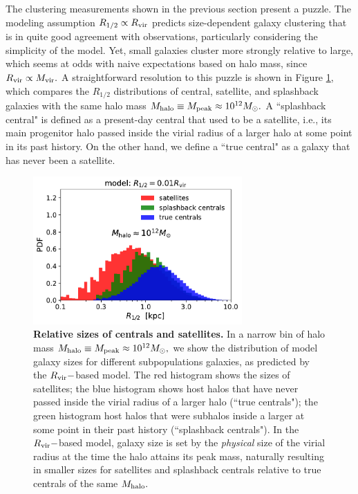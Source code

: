 \documentclass[usenatbib,usegraphicx,letterpaper]{mn2e}
\newcommand{\rhalf}{R_{1/2}}
\newcommand{\mvir}{M_{\rm vir}}
\newcommand{\mpeak}{M_{\rm peak}}
\newcommand{\mhalo}{M_{\rm halo}}
\newcommand{\rvir}{R_{\rm vir}}
\newcommand{\msun}{M_\odot}
\begin{document}
The clustering measurements shown in the previous section present a puzzle. The modeling assumption $\rhalf\propto\rvir$ predicts size-dependent galaxy clustering that is in quite good agreement with observations, particularly considering the simplicity of the model. Yet, small galaxies cluster more strongly relative to large, which seems at odds with naive expectations based on halo mass, since $\rvir\propto\mvir.$ A straightforward resolution to this puzzle is shown in Figure \ref{fig:censatsizehist}, which compares the $\rhalf$ distributions of central, satellite, and splashback galaxies with the same halo mass $\mhalo\equiv\mpeak\approx10^{12}\msun.$ A ``splashback central"  is defined as a present-day central that used to be a satellite, i.e., its main progenitor halo passed inside the virial radius of a larger halo at some point in its past history. On the other hand, we define a ``true central" as a galaxy that has never been a satellite.

\begin{figure}
\centering
\includegraphics[width=8cm]{FIGS/rvir_only_cen_sat_sizes.pdf}
\caption{
{\bf Relative sizes of centrals and satellites.}
In a narrow bin of halo mass $\mhalo\equiv\mpeak\approx10^{12}\msun,$ we show the distribution of model galaxy sizes for different subpopulations galaxies, as predicted by the $\rvir-$based model. The red histogram shows the sizes of satellites; the blue histogram shows host halos that have never passed inside the virial radius of a larger halo (``true centrals"); the green histogram host halos that were subhalos inside a larger at some point in their past history (``splashback centrals"). In the $\rvir-$based model, galaxy size is set by the {\em physical} size of the virial radius at the time the halo attains its peak mass, naturally resulting in smaller sizes for satellites and splashback centrals relative to true centrals of the same $\mhalo.$
}
\label{fig:censatsizehist}
\end{figure}
\end{document}
